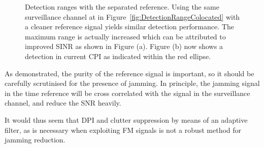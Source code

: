 \documentclass[english, 12pt]{report}
\begin{document}
\begin{figure}[ht]
\centering
{}
\hfill
{}
\hfill
\caption[Detection ranges with the separated reference.]{Detection ranges with the separated reference. Using the same surveillance channel at in Figure~\ref{fig:DetectionRangeColocated} with a cleaner reference signal yields similar detection performance. The maximum range is actually increased which can be attributed to improved SINR as shown in Figure (a). Figure (b) now shows a detection in current CPI as indicated within the red ellipse.}
\label{fig:DetectionRangeSepRef}
\end{figure}

\clearpage

As demonstrated, the purity of the reference signal is important, so it should be carefully scrutinised for the presence of jamming. In principle, the jamming signal in the time reference will be cross correlated with the signal in the surveillance channel, and reduce the SNR heavily.

It would thus seem that DPI and clutter suppression by means of an adaptive filter, as is necessary when exploiting FM signals is not a robust method for jamming reduction.
\end{document}
